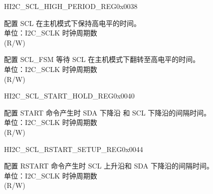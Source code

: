 \begin{register}{H}{I2C\_SCL\_HIGH\_PERIOD\_REG}{0x0038}\label{regdesc:I2CSCLHIGHPERIODREG}
%
%
%
\regnewline%
\begin{regdesc}\begin{reglist}
\label{fielddesc:I2CSCLHIGHPERIOD}\item [I2C\_SCL\_HIGH\_PERIOD] 配置 SCL 在主机模式下保持高电平的时间。\\
单位：I2C\_SCLK 时钟周期数 \\ (R/W)
\label{fielddesc:I2CSCLWAITHIGHPERIOD}\item [I2C\_SCL\_WAIT\_HIGH\_PERIOD] 配置 SCL\_FSM 等待 SCL 在主机模式下翻转至高电平的时间。\\
单位：I2C\_SCLK 时钟周期数 \\ (R/W)
\end{reglist}\end{regdesc}
\end{register}


\begin{register}{H}{I2C\_SCL\_START\_HOLD\_REG}{0x0040}\label{regdesc:I2CSCLSTARTHOLDREG}
%
%
\regnewline%
\begin{regdesc}\begin{reglist}
\label{fielddesc:I2CSCLSTARTHOLDTIME}\item [I2C\_SCL\_START\_HOLD\_TIME] 配置 START 命令产生时 SDA 下降沿 和 SCL 下降沿的间隔时间。\\
单位：I2C\_SCLK 时钟周期数 \\ (R/W)
\end{reglist}\end{regdesc}
\end{register}


\begin{register}{H}{I2C\_SCL\_RSTART\_SETUP\_REG}{0x0044}\label{regdesc:I2CSCLRSTARTSETUPREG}
%
%
\regnewline%
\begin{regdesc}\begin{reglist}
\label{fielddesc:I2CSCLRSTARTSETUPTIME}\item [I2C\_SCL\_RSTART\_SETUP\_TIME] 配置 RSTART 命令产生时 SCL 上升沿和 SDA 下降沿的间隔时间。\\
单位：I2C\_SCLK 时钟周期数 \\ (R/W)
\end{reglist}\end{regdesc}
\end{register}


